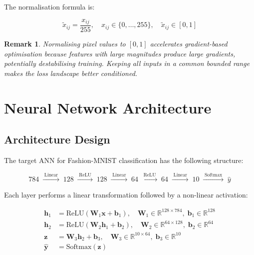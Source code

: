 \documentclass[12pt,a4paper]{article}
\newtheorem{remark}{Remark}[section]
\begin{document}
The normalisation formula is:

\begin{equation}
  \tilde{x}_{ij} = \frac{x_{ij}}{255}, \quad x_{ij} \in \{0,\ldots,255\},
  \quad \tilde{x}_{ij} \in [0, 1]
  \label{eq:normalise}
\end{equation}

\begin{remark}
\label{rem:normalise}
Normalising pixel values to $[0,1]$ accelerates gradient-based optimisation
because features with large magnitudes produce large gradients, potentially
destabilising training.  Keeping all inputs in a common bounded range makes
the loss landscape better conditioned.
\end{remark}

\section{Neural Network Architecture}
\label{sec:architecture}

\subsection{Architecture Design}
\label{subsec:arch-design}

The target ANN for Fashion-MNIST classification has the following structure:

\begin{equation}
  784 \;\xrightarrow{\;\text{Linear}\;}\; 128
      \;\xrightarrow{\;\text{ReLU}\;}\;
      128 \;\xrightarrow{\;\text{Linear}\;}\; 64
      \;\xrightarrow{\;\text{ReLU}\;}\;
      64  \;\xrightarrow{\;\text{Linear}\;}\; 10
      \;\xrightarrow{\;\text{Softmax}\;}\; \hat{y}
  \label{eq:arch}
\end{equation}

Each layer performs a linear transformation followed by a non-linear
activation:

\begin{align}
  \mathbf{h}_1 &= \text{ReLU}(\mathbf{W}_1 \mathbf{x} + \mathbf{b}_1),
    \quad \mathbf{W}_1 \in \mathbb{R}^{128 \times 784},\;
          \mathbf{b}_1 \in \mathbb{R}^{128} \label{eq:layer1} \\
  \mathbf{h}_2 &= \text{ReLU}(\mathbf{W}_2 \mathbf{h}_1 + \mathbf{b}_2),
    \quad \mathbf{W}_2 \in \mathbb{R}^{64 \times 128},\;
          \mathbf{b}_2 \in \mathbb{R}^{64}  \label{eq:layer2} \\
  \mathbf{z}   &= \mathbf{W}_3 \mathbf{h}_2 + \mathbf{b}_3,
    \quad \mathbf{W}_3 \in \mathbb{R}^{10 \times 64},\;
          \mathbf{b}_3 \in \mathbb{R}^{10}   \label{eq:layer3} \\
  \hat{\mathbf{y}} &= \text{Softmax}(\mathbf{z}) \label{eq:softmax}
\end{align}
\end{document}
